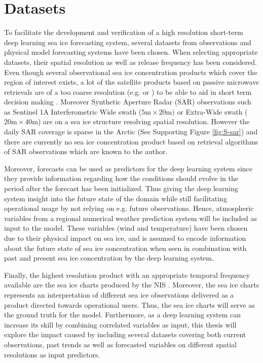 \documentclass[../main/thesis.tex]{subfiles}
\begin{document}
\section{Datasets}
To facilitate the development and verification of a high resolution short-term deep learning sea ice forecasting system, several datasets from observations and physical model forecasting systems have been chosen. When selecting appropriate datasets, their spatial resolution as well as release frequency has been considered. Even though several observational sea ice concentration products which cover the region of interest exists, a lot of the satellite products based on passive microwave retrievals are of a too coarse resolution (e.g. \citet{Lavergne2019} or \citet{Kern2019}) to be able to aid in short term decision making \citep{Wagner2020}. Moreover Synthetic Aperture Radar (SAR) observations such as Sentinel 1A Interferometric Wide swath ($5\text{m} \times 20\text{m})$ or Extra-Wide swath ($20\text{m} \times 40\text{m}$) are on a sea ice structure resolving spatial resolution. However the daily SAR coverage is sparse in the Arctic (See Supporting Figure \ref{fig:S-sar}) and there are currently no sea ice concentration product based on retrieval algorithms of SAR observations which are known to the author.

Moreover, forecasts can be used as predictors for the deep learning system since they provide information regarding how the conditions should evolve in the period after the forecast has been initialized. Thus giving the deep learning system insight into the future state of the domain while still facilitating operational usage by not relying on e.g. future observations. Hence, atmospheric variables from a regional numerical weather prediction system will be included as input to the model. These variables (wind and temperature) have been chosen due to their physical impact on sea ice, and is assumed to encode information about the future state of sea ice concentration when seen in combination with past and present sea ice concentration by the deep learning system.

Finally, the highest resolution product with an appropriate temporal frequency available are the sea ice charts produced by the NIS \citep{Dinessen2020}. Moreover, the sea ice charts represents an interpretation of different sea ice observations delivered as a product directed towards operational users. Thus, the sea ice charts will serve as the ground truth for the model. Furthermore, as a deep learning system can increase its skill by combining correlated variables as input, this thesis will explore the impact caused by including several datasets covering both current observations, past trends as well as forecasted variables on different spatial resolutions as input predictors.
\end{document}

